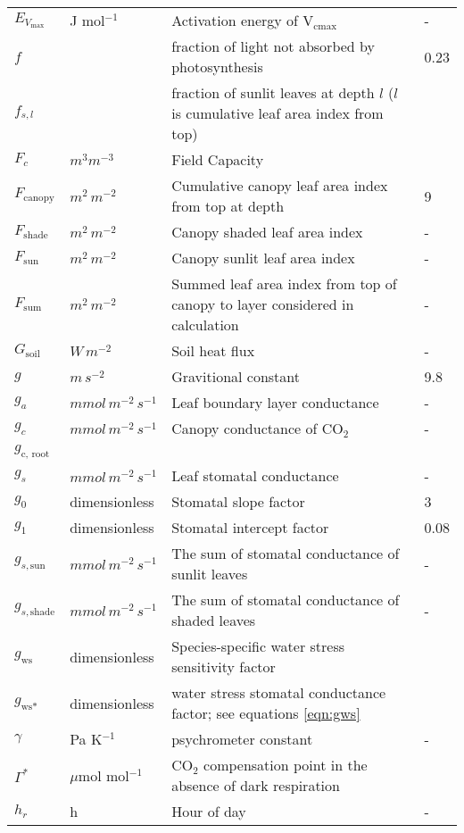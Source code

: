 \documentclass[10pt]{article}
\renewcommand{\marginnote}[2][]{}
\begin{document}
\begin{center}
\begin{longtable}{l l p{3in} p{0.5in}}
$E_{V_\text{max}}$ & J mol$^{-1}$ & Activation energy of V$_\text{cmax}$& - \\
$f$ & & fraction of light not absorbed by photosynthesis & 0.23 \\
$f_{s,l}$ & & fraction of sunlit leaves at depth $l$ ($l$ is cumulative leaf area index from top) & \\
$F_c$ & $m^3m^{-3}$ & Field Capacity & \\
$F_{\text{canopy}}$	&	$m^2\, m^{-2}$	&Cumulative canopy leaf area index from top at depth	&	9	\\
$F_{\text{shade}}$	&	$m^2\, m^{-2}$	&	Canopy shaded leaf area index	&	-	\\
$F_{\text{sun}}$	&	$m^2\,m^{-2}$	&	Canopy sunlit leaf area index	&	-	\\
$F_{\text{sum}}$	&	$m^2\, m^{-2}$	&	Summed leaf area index from top of canopy to layer considered in calculation	&	-	\\
$G_{\text{soil}}$	&	$W\,m^{-2}$	&	Soil heat flux	&	-	\\
$g$	&	$m\, s^{-2}$	&	Gravitional constant	&	9.8	\\
$g_a$	&	$mmol\,m^{-2}\, s^{-1}$	&	Leaf boundary layer conductance	&	-	\\
$g_c$	&	$mmol\,m^{-2}\, s^{-1}$	&	Canopy conductance of CO$_2$ 	&	-	\\
$g_\text{c, root}$	&	& & \marginnote{undefined}\\
$g_s$	&	$mmol\,m^{-2}\, s^{-1}$	&	Leaf stomatal conductance	&	-	\\
$g_0$	&	dimensionless	&	Stomatal slope factor	&	3	\\
$g_1$	&	dimensionless	&	Stomatal intercept factor	&	0.08	\\
$g_{s,\text{sun}}$	&	$mmol\, m^{-2}\, s^{-1}$	&	The sum of stomatal conductance of sunlit leaves	&	-	\\
$g_{s,\text{shade}}$	&	$mmol\, m^{-2}\, s^{-1}$	&	The sum of stomatal conductance of shaded leaves	&	-	\\
$g_\text{ws}$ & dimensionless & Species-specific water stress sensitivity factor & \\
$g_\text{ws*}$ & dimensionless & water stress stomatal conductance factor; see equations \ref{eqn:gws} &\\
$\gamma$	&	Pa K$^{-1}$	&	psychrometer constant 	&	-	\\
$\Gamma^\ast$ & $\mu$mol mol$^{-1}$ & CO$_2$ compensation point in the absence of dark respiration & \\
$h_r$	&	h	&	Hour of day	&	-	\\

\end{longtable}
\end{center}
\end{document}
